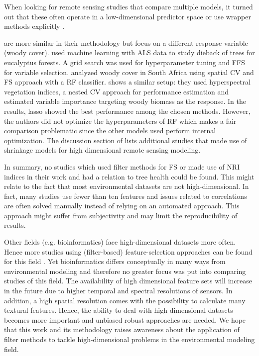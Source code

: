 \documentclass[remotesensing,article,submit,moreauthors,pdftex]{Definitions/mdpi}
\begin{document}
When looking for remote sensing studies that compare multiple models, it turned out that these often operate in a low-dimensional predictor space \cite{xu2019} or use wrapper methods explicitly \cite{georganos2018}.

\cite{shendryk2016, ludwig2019} are more similar in their methodology but focus on a different response variable (woody cover).
\cite{shendryk2016} used machine learning with \ac{ALS} data to study dieback of trees for eucalyptus forests.
A grid search was used for hyperparameter tuning and \ac{FFS} for variable selection.
\cite{ludwig2019} analyzed woody cover in South Africa using spatial \ac{CV} and \ac{FS} approach \cite{meyer2018} with a RF classifier.
\cite{zandler2015} shows a similar setup: they used hyperspectral vegetation indices, a nested CV approach for performance estimation and estimated variable importance targeting woody biomass as the response.
In the results, lasso showed the best performance among the chosen methods.
However, the authors did not optimize the hyperparameters of RF which makes a fair comparison problematic since the other models used perform internal optimization.
The discussion section of \cite{zandler2015} lists additional studies that made use of shrinkage models for high dimensional remote sensing modeling.

In summary, no studies which used filter methods for \ac{FS} or made use of \ac{NRI} indices in their work and had a relation to tree health could be found.
This might relate to the fact that most environmental datasets are not high-dimensional.
In fact, many studies use fewer than ten features and issues related to correlations are often solved manually instead of relying on an automated approach.
This approach might suffer from subjectivity and may limit the reproducibility of results.

Other fields (e.g. bioinformatics) face high-dimensional datasets more often.
Hence more studies using (filter-based) feature-selection approaches can be found for this field \cite{guo2019, radovic2017}.
Yet bioinformatics differs conceptually in many ways from environmental modeling and therefore no greater focus was put into comparing studies of this field.
The availability of high dimensional feature sets will increase in the future due to higher temporal and spectral resolutions of sensors.
In addition, a high spatial resolution comes with the possibility to calculate many textural features.
Hence, the ability to deal with high dimensional datasets becomes more important and unbiased robust approaches are needed.
We hope that this work and its methodology raises awareness about the application of filter methods to tackle high-dimensional problems in the environmental modeling field.
\end{document}
